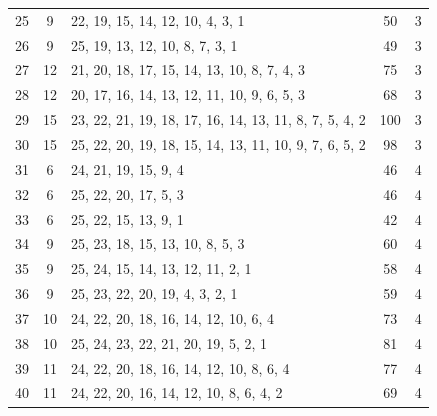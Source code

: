 \begin{table}[b]
\begin{tabular}{cclcc}
   25 &   9 & 22, 19, 15, 14, 12, 10, 4, 3, 1 &  50 &   3 \\
   26 &   9 & 25, 19, 13, 12, 10, 8, 7, 3, 1 &  49 &   3 \\
   27 &  12 & 21, 20, 18, 17, 15, 14, 13, 10, 8, 7, 4, 3 &  75 &   3 \\
   28 &  12 & 20, 17, 16, 14, 13, 12, 11, 10, 9, 6, 5, 3 &  68 &   3 \\
   29 &  15 & 23, 22, 21, 19, 18, 17, 16, 14, 13, 11, 8, 7, 5, 4, 2 & 100 &   3 \\
   30 &  15 & 25, 22, 20, 19, 18, 15, 14, 13, 11, 10, 9, 7, 6, 5, 2 &  98 &   3 \\
   31 &   6 & 24, 21, 19, 15, 9, 4 &  46 &   4 \\
   32 &   6 & 25, 22, 20, 17, 5, 3 &  46 &   4 \\
   33 &   6 & 25, 22, 15, 13, 9, 1 &  42 &   4 \\
   34 &   9 & 25, 23, 18, 15, 13, 10, 8, 5, 3 &  60 &   4 \\
   35 &   9 & 25, 24, 15, 14, 13, 12, 11, 2, 1 &  58 &   4 \\
   36 &   9 & 25, 23, 22, 20, 19, 4, 3, 2, 1 &  59 &   4 \\
   37 &  10 & 24, 22, 20, 18, 16, 14, 12, 10, 6, 4 &  73 &   4 \\
   38 &  10 & 25, 24, 23, 22, 21, 20, 19, 5, 2, 1 &  81 &   4 \\
   39 &  11 & 24, 22, 20, 18, 16, 14, 12, 10, 8, 6, 4 &  77 &   4 \\
   40 &  11 & 24, 22, 20, 16, 14, 12, 10, 8, 6, 4, 2 &  69 &   4 \\
   \bottomrule
\end{tabular}
\end{table}
